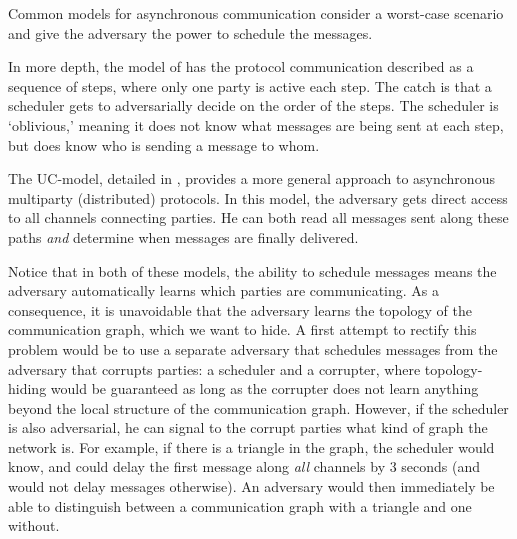 
Common models for asynchronous communication 
\cite{STOC:BenCanGol93,FOCS:Canetti01} consider a worst-case scenario and give 
the adversary the power to schedule the messages.

In more depth, the model of \cite{STOC:BenCanGol93} has the protocol communication described as a sequence of steps, where only one party is active each step. The catch is that a scheduler gets to adversarially decide on the order of the steps. The scheduler is `oblivious,' meaning it does not know what messages are being sent at each step, but does know who is sending a message to whom.

The UC-model, detailed in \cite{FOCS:Canetti01}, provides a more general approach to asynchronous multiparty (distributed) protocols. In this model, the adversary gets direct access to all channels connecting parties. He can both read all messages sent along these paths \emph{and} determine when messages are finally delivered.

Notice that in both of these models, the ability to schedule messages means the adversary automatically learns which parties 
are communicating. As a consequence, it is unavoidable that the adversary 
learns the topology of the communication graph, which we want to hide. A first attempt to rectify this problem would be to use a separate adversary that schedules messages from the adversary that corrupts parties: a scheduler and a corrupter, where topology-hiding would be guaranteed as long as the corrupter does not learn anything beyond the local structure of the communication graph. However, if the scheduler is also adversarial, he can signal to the corrupt parties what kind of graph the network is. For example, if there is a triangle in the graph, the scheduler would know, and could delay the first message along \emph{all} channels by 3 seconds (and would not delay messages otherwise). An adversary would then immediately be able to distinguish between a communication graph with a triangle and one without.